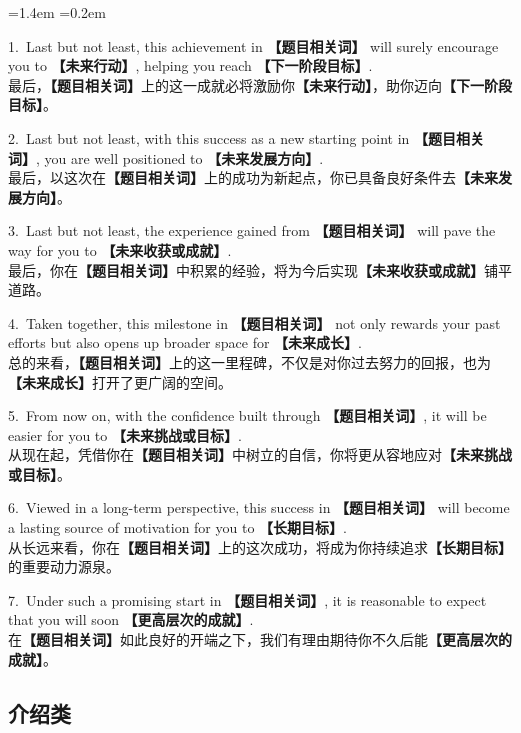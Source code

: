 \documentclass[11pt,a4paper]{ctexart}
\newcommand{\fillin}[1]{{\bfseries【#1】}}
\newenvironment{eg}{%
  \par\addvspace{4pt}%
  \begin{list}{}{\leftmargin=1.4em \rightmargin=0.2em \listparindent=0pt
    \itemindent=0pt \topsep=0pt \parsep=2pt \itemsep=2pt \partopsep=0pt}%
  \item\relax
}{%
  \end{list}\addvspace{5pt}%
}
\begin{document}
\begin{eg}
1.\ Last but not least, this achievement in \fillin{题目相关词} will surely encourage you to \fillin{未来行动}, helping you reach \fillin{下一阶段目标}.\\
最后，\fillin{题目相关词}上的这一成就必将激励你\fillin{未来行动}，助你迈向\fillin{下一阶段目标}。

2.\ Last but not least, with this success as a new starting point in \fillin{题目相关词}, you are well positioned to \fillin{未来发展方向}.\\
最后，以这次在\fillin{题目相关词}上的成功为新起点，你已具备良好条件去\fillin{未来发展方向}。

3.\ Last but not least, the experience gained from \fillin{题目相关词} will pave the way for you to \fillin{未来收获或成就}.\\
最后，你在\fillin{题目相关词}中积累的经验，将为今后实现\fillin{未来收获或成就}铺平道路。

4.\ Taken together, this milestone in \fillin{题目相关词} not only rewards your past efforts but also opens up broader space for \fillin{未来成长}.\\
总的来看，\fillin{题目相关词}上的这一里程碑，不仅是对你过去努力的回报，也为\fillin{未来成长}打开了更广阔的空间。

5.\ From now on, with the confidence built through \fillin{题目相关词}, it will be easier for you to \fillin{未来挑战或目标}.\\
从现在起，凭借你在\fillin{题目相关词}中树立的自信，你将更从容地应对\fillin{未来挑战或目标}。

6.\ Viewed in a long-term perspective, this success in \fillin{题目相关词} will become a lasting source of motivation for you to \fillin{长期目标}.\\
从长远来看，你在\fillin{题目相关词}上的这次成功，将成为你持续追求\fillin{长期目标}的重要动力源泉。

7.\ Under such a promising start in \fillin{题目相关词}, it is reasonable to expect that you will soon \fillin{更高层次的成就}.\\
在\fillin{题目相关词}如此良好的开端之下，我们有理由期待你不久后能\fillin{更高层次的成就}。
\end{eg}


\subsection{介绍类}
\end{document}

